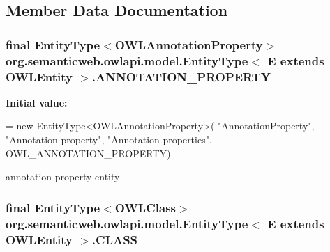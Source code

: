 \subsection{Member Data Documentation}
\hypertarget{classorg_1_1semanticweb_1_1owlapi_1_1model_1_1_entity_type_3_01_e_01extends_01_o_w_l_entity_01_4_a0423be5be2a0ea0ca6b7ef032c4d8600}{
\subsubsection[{A\-N\-N\-O\-T\-A\-T\-I\-O\-N\-\_\-\-P\-R\-O\-P\-E\-R\-T\-Y}]{\setlength{\rightskip}{0pt plus 5cm}final {\bf Entity\-Type}$<${\bf O\-W\-L\-Annotation\-Property}$>$ org.\-semanticweb.\-owlapi.\-model.\-Entity\-Type$<$ E extends {\bf O\-W\-L\-Entity} $>$.A\-N\-N\-O\-T\-A\-T\-I\-O\-N\-\_\-\-P\-R\-O\-P\-E\-R\-T\-Y\hspace{0.3cm}{\ttfamily [static]}}}\label{classorg_1_1semanticweb_1_1owlapi_1_1model_1_1_entity_type_3_01_e_01extends_01_o_w_l_entity_01_4_a0423be5be2a0ea0ca6b7ef032c4d8600}
{\bfseries Initial value\-:}
\begin{DoxyCode}
= \textcolor{keyword}{new} EntityType<OWLAnnotationProperty>(
            \textcolor{stringliteral}{"AnnotationProperty"}, \textcolor{stringliteral}{"Annotation property"}, \textcolor{stringliteral}{"Annotation properties"},
            OWL\_ANNOTATION\_PROPERTY)
\end{DoxyCode}
annotation property entity \hypertarget{classorg_1_1semanticweb_1_1owlapi_1_1model_1_1_entity_type_3_01_e_01extends_01_o_w_l_entity_01_4_a2aabc1acaffd622a5fbd1b3dad335bae}{
\subsubsection[{C\-L\-A\-S\-S}]{\setlength{\rightskip}{0pt plus 5cm}final {\bf Entity\-Type}$<${\bf O\-W\-L\-Class}$>$ org.\-semanticweb.\-owlapi.\-model.\-Entity\-Type$<$ E extends {\bf O\-W\-L\-Entity} $>$.C\-L\-A\-S\-S\hspace{0.3cm}{\ttfamily [static]}}}\label{classorg_1_1semanticweb_1_1owlapi_1_1model_1_1_entity_type_3_01_e_01extends_01_o_w_l_entity_01_4_a2aabc1acaffd622a5fbd1b3dad335bae}
